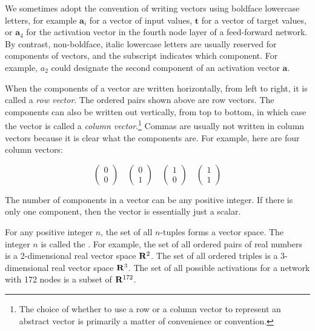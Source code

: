    We sometimes adopt the convention of writing vectors using boldface 
lowercase letters, for example $\mathbf{a}_i$ for a  vector of input values, 
$\mathbf{t}$ for a vector of target values, or $\mathbf{a}_4$ for the 
activation vector in the fourth node layer of a feed-forward network. By 
contrast, non-boldface, italic lowercase letters are usually reserved for 
components of vectors, and the subscript indicates which component. For 
example, $a_2$ could designate the second component of an activation vector 
$\mathbf{a}$.

When the components of a vector are written horizontally, from left to right,
it is called a {\em row vector}. The ordered pairs shown above are row 
vectors. The components can also be written out vertically, from top to 
bottom, in which case the vector is called a {\em column vector}.\footnote{The choice of whether
to use a row or a column vector to represent an abstract vector is primarily a matter of 
convenience or convention.} Commas are usually 
not written in column vectors because it is clear what the components are. For 
example, here are four column vectors:
\begin{small}
\begin{equation*}
\begin{pmatrix}
0 \\
0
\end{pmatrix} 
\quad 
\begin{pmatrix}
0 \\
1
\end{pmatrix} 
\quad 
\begin{pmatrix}
1 \\
0
\end{pmatrix} 
\quad 
\begin{pmatrix}
1 \\
1
\end{pmatrix} 
\end{equation*}
\end{small}
The number of components in a vector can be any positive integer. If there is
only one component, then the vector is essentially just a scalar.

   For any positive integer $n$, the set of all $n$-tuples forms a vector space.
The integer $n$ is called the . For 
example, the set of all ordered pairs of real numbers is a 2-dimensional
real vector space ${\bf R}^2$. The set of all ordered triples is a 3-dimensional real 
vector space ${\bf R}^3$. The set of all possible activations for a network with 172 nodes is a subset of  ${\bf R}^{172}$.

